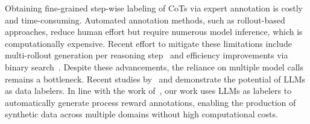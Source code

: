 Obtaining fine-grained step-wise labeling of CoTs via expert annotation is costly and time-consuming. 
Automated annotation methods, such as rollout-based approaches, reduce human effort but require numerous model inference, which is computationally expensive.
Recent effort to mitigate these limitations include multi-rollout generation per reasoning step~\citep{wang2024math,wang-etal-2024-multi-step} and efficiency improvements via binary search~\citep{luo2024improve}. 
Despite these advancements, the reliance on multiple model calls remains a bottleneck. Recent studies by~\citet{pnasFabrizio} and \citet{fonseca-cohen-2024-large} demonstrate the potential of LLMs as data labelers. In line with the work of~\citet{zheng2024processbench}, our work uses LLMs as labelers to automatically generate process reward annotations, enabling the production of synthetic data across multiple domains without high computational costs.